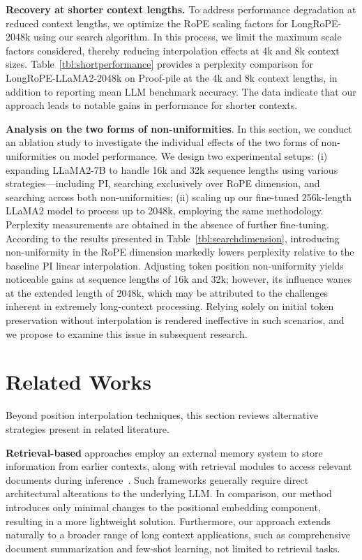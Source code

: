 \textbf{Recovery at shorter context lengths.} To address performance degradation at reduced context lengths, we optimize the RoPE scaling factors for LongRoPE-2048k using our search algorithm. In this process, we limit the maximum scale factors considered, thereby reducing interpolation effects at 4k and 8k context sizes. 
 Table~\ref{tbl:shortperformance} provides a perplexity comparison for LongRoPE-LLaMA2-2048k on Proof-pile at the 4k and 8k context lengths, in addition to reporting mean LLM benchmark accuracy. The data indicate that our approach leads to notable gains in performance for shorter contexts.

\textbf{Analysis on the two forms of non-uniformities}. In this section, we conduct an ablation study to investigate the individual effects of the two forms of non-uniformities on model performance. We design two experimental setups: (i) expanding LLaMA2-7B to handle 16k and 32k sequence lengths using various strategies—including PI, searching exclusively over RoPE dimension, and searching across both non-uniformities; (ii) scaling up our fine-tuned 256k-length LLaMA2 model to process up to 2048k, employing the same methodology. Perplexity measurements are obtained in the absence of further fine-tuning. According to the results presented in Table~\ref{tbl:searchdimension}, introducing non-uniformity in the RoPE dimension markedly lowers perplexity relative to the baseline PI linear interpolation. Adjusting token position non-uniformity yields noticeable gains at sequence lengths of 16k and 32k; however, its influence wanes at the extended length of 2048k, which may be attributed to the challenges inherent in extremely long-context processing. Relying solely on initial token preservation without interpolation is rendered ineffective in such scenarios, and we propose to examine this issue in subsequent research.

\section{Related Works}

Beyond position interpolation techniques, this section reviews alternative strategies present in related literature.

\textbf{Retrieval-based} approaches employ an external memory system to store information from earlier contexts, along with retrieval modules to access relevant documents during inference~\cite{longllama,wang2023augmenting,borgeaud2022improving}. Such frameworks generally require direct architectural alterations to the underlying LLM. In comparison, our method introduces only minimal changes to the positional embedding component, resulting in a more lightweight solution. Furthermore, our approach extends naturally to a broader range of long context applications, such as comprehensive document summarization and few-shot learning, not limited to retrieval tasks.

